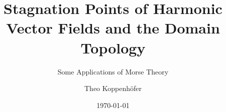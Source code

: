 





\title{Stagnation Points of Harmonic Vector Fields and the Domain Topology}
\subtitle{Some Applications of Morse Theory}
\author{Theo Koppenhöfer}
\date{\today}


\graphicspath{{../Art/}}
\graphicspath{{../Plots/}}
\graphicspath{{../Figures/}}

\tikzexternaldisable


\usepackage{transparent}

\newcommand{\openX}{\interior\brk*{X}}
\newcommand{\questionFlowthrough}{\begin{question}[Flowthrough with stagnation point] \label{qu:flowthroughStagnationPoint}
    Does there exist a domain $X\subset\R^d$ homeomorphic to a ball and a harmonic vector field $u\colon X\to\R^d$ such that
    \begin{enumerate}
      \item $u$ has an interior stagnation point
      \item the boundaries on which $u$ enters and leaves the region are connected?
    \end{enumerate}
\end{question}}





{
\frame[plain]{\titlepage}
}

